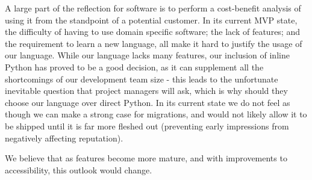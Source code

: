 A large part of the reflection for software is to perform a cost-benefit analysis of using it from the standpoint of a
potential customer.
In its current MVP state, the difficulty of having to use domain specific software; the lack of features; and the
requirement to learn a new language, all make it hard to justify the usage of our language.
While our language lacks many features, our inclusion of inline Python has proved to be a good decision, as it can
supplement all the shortcomings of our development team size - this leads to the unfortunate inevitable question that
project managers will ask, which is why should they choose our language over direct Python.
In its current state we do not feel as though we can make a strong case for migrations, and would not likely allow it to
be shipped until it is far more fleshed out (preventing early impressions from negatively affecting reputation).

We believe that as features become more mature, and with improvements to accessibility, this outlook would change.

